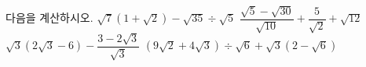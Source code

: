 다음을 계산하시오.
 $\sqrt{7}(1+\sqrt{2})-\sqrt{35}\div\sqrt{5}$
 $\dfrac{\sqrt{5}-\sqrt{30}}{\sqrt{10}}+\dfrac{5}{\sqrt{2}}+\sqrt{12}$
 $\sqrt{3}(2\sqrt{3}-6)-\dfrac{3-2\sqrt{3}}{\sqrt{3}}$
 $(9\sqrt{2}+4\sqrt{3})\div\sqrt{6}+\sqrt{3}(2-\sqrt{6})$
